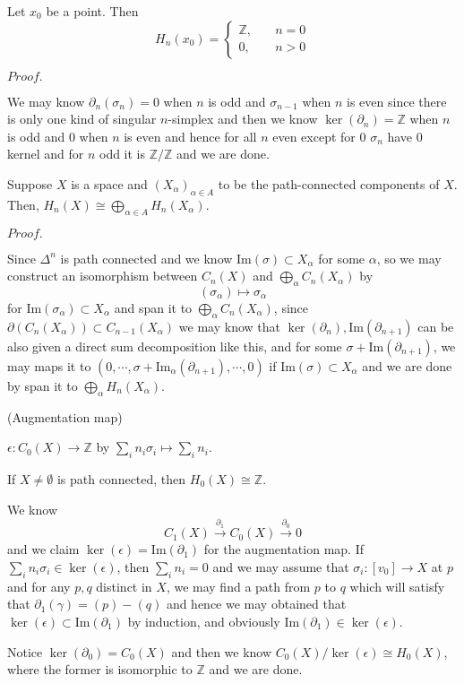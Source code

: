 \documentclass{article}
\newcommand{\Pf}[1]{$Proof.$\par}
\begin{document}
\begin{proposition}
    Let $x_0$ be a point. Then
    \[
    H_n(x_0) = \begin{cases}
        \mathbb{Z},\quad &n=0 \\
        0,& n > 0
    \end{cases}
    \]
\end{proposition}
\Pf\par
    We may know $\partial_n(\sigma_n) = 0$ when $n$ is odd and $\sigma_{n-1}$ when $n$ is even since there is only one kind of singular $n$-simplex and then we know $\ker(\partial_n) = \mathbb{Z}$ when $n$ is odd and $0$ when $n$ is even and hence for all $n$ even except for $0$ $\sigma_n$ have $0$ kernel and for $n$ odd it is $\mathbb{Z}/\mathbb{Z}$ and we are done.

\begin{proposition}
    Suppose $X$ is a space and $(X_{\alpha})_{\alpha\in A}$ to be the path-connected components of $X$. Then, $H_n(X) \cong \bigoplus_{\alpha\in A} H_n(X_{\alpha})$.
\end{proposition}
\Pf\par
    Since $\Delta^n$ is path connected and we know $\text{Im}(\sigma) \subset X_{\alpha}$ for some $\alpha$, so we may construct an isomorphism between $C_n(X)$ and $\bigoplus_{\alpha} C_n(X_{\alpha})$ by
    \[(\sigma_{\alpha})\mapsto \sigma_{\alpha}\]
    for $\text{Im}(\sigma_{\alpha}) \subset X_{\alpha}$ and span it to $\bigoplus_{\alpha} C_n(X_{\alpha})$, since $\partial(C_n(X_{\alpha})) \subset C_{n-1}(X_{\alpha})$ we may know that $\ker(\partial_n), \text{Im}(\partial_{n+1})$ can be also given a direct sum decomposition like this, and for some $\sigma + \text{Im}(\partial_{n+1})$, we may maps it to $(0,\cdots,\sigma+\text{Im}_{\alpha}(\partial_{n+1}),\cdots,0)$ if $\text{Im}(\sigma) \subset X_{\alpha}$ and we are done by span it to $\bigoplus_{\alpha}H_n(X_{\alpha})$.

\begin{definition}(Augmentation map)\par
    $\epsilon: C_0(X) \to \mathbb{Z}$ by $\sum\limits_i n_i\sigma_i \mapsto \sum_i n_i$.
\end{definition}

\begin{proposition}
    If $X\neq \emptyset$ is path connected, then $H_0(X) \cong \mathbb{Z}$.
\end{proposition}
    We know
    \[C_1(X) \overset{\partial_1}{\rightarrow} C_0(X) \overset{\partial_0}{\rightarrow} 0\]
    and we claim $\ker(\epsilon) = \text{Im}(\partial_1)$ for the augmentation map.
    If $\sum\limits_i n_i \sigma_i \in \ker(\epsilon)$, then $\sum\limits_i n_i = 0$ and we may assume that $\sigma_i: [v_0] \to X$ at $p$ and for any $p,q$ distinct in $X$, we may find a path from $p$ to $q$ which will satisfy that $\partial_1(\gamma) = (p) - (q)$ and hence we may obtained that $\ker(\epsilon) \subset \text{Im}(\partial_1)$ by induction, and obviously $\text{Im}(\partial_1) \in \ker(\epsilon)$.\par
    Notice $\ker(\partial_0) = C_0(X)$ and then we know $C_0(X)/\ker(\epsilon) \cong H_0(X)$, where the former is isomorphic to $\mathbb{Z}$ and we are done.
\end{document}
